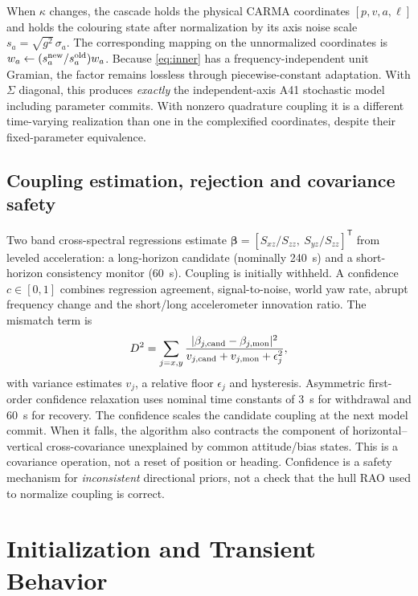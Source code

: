 \documentclass[conference]{IEEEtran}
\newcommand{\vct}[1]{\bm{#1}}
\newcommand{\T}{^{\mathsf T}}
\begin{document}
When $\kappa$ changes, the cascade holds the physical CARMA coordinates
$[p,v,a,\ell]$ and holds the colouring state after normalization by its
axis noise scale $s_a=\sqrt{g^2}\,\sigma_a$. The corresponding mapping on
the unnormalized coordinates is $w_a\leftarrow
(s_a^{\rm new}/s_a^{\rm old})w_a$. Because \eqref{eq:inner} has a
frequency-independent unit Gramian, the factor remains lossless through
piecewise-constant adaptation. With $\Sigma$ diagonal, this produces
\emph{exactly} the independent-axis A41 stochastic model including
parameter commits. With nonzero quadrature coupling it is a different
time-varying realization than one in the complexified coordinates, despite
their fixed-parameter equivalence.

\subsection{Coupling estimation, rejection and covariance safety}
Two band cross-spectral regressions estimate
$\vct\beta=[S_{xz}/S_{zz},\ S_{yz}/S_{zz}]\T$ from leveled
acceleration: a long-horizon candidate (nominally \SI{240}{s}) and a
short-horizon consistency monitor (\SI{60}{s}). Coupling is initially
withheld. A confidence $c\in[0,1]$ combines regression agreement,
signal-to-noise, world yaw rate, abrupt frequency change and the
short/long accelerometer innovation ratio. The mismatch term is
\begin{equation}
 D^2=\sum_{j=x,y}\frac{|\beta_{j,\rm cand}-\beta_{j,\rm mon}|^2}
 {v_{j,\rm cand}+v_{j,\rm mon}+\epsilon_j^2},
 \label{eq:confidence}
\end{equation}
with variance estimates $v_j$, a relative floor $\epsilon_j$ and
hysteresis. Asymmetric first-order confidence relaxation uses nominal
time constants of \SI{3}{s} for withdrawal and \SI{60}{s} for recovery.
The confidence scales the candidate coupling at the next model commit.
When it falls, the algorithm also contracts the component of
horizontal--vertical cross-covariance unexplained by common attitude/bias
states. This is a covariance operation, not a reset of position or heading.
Confidence is a safety mechanism for \emph{inconsistent} directional priors,
not a check that the hull RAO used to normalize coupling is correct.

\section{Initialization and Transient Behavior}
\label{sec:startup}
\end{document}
